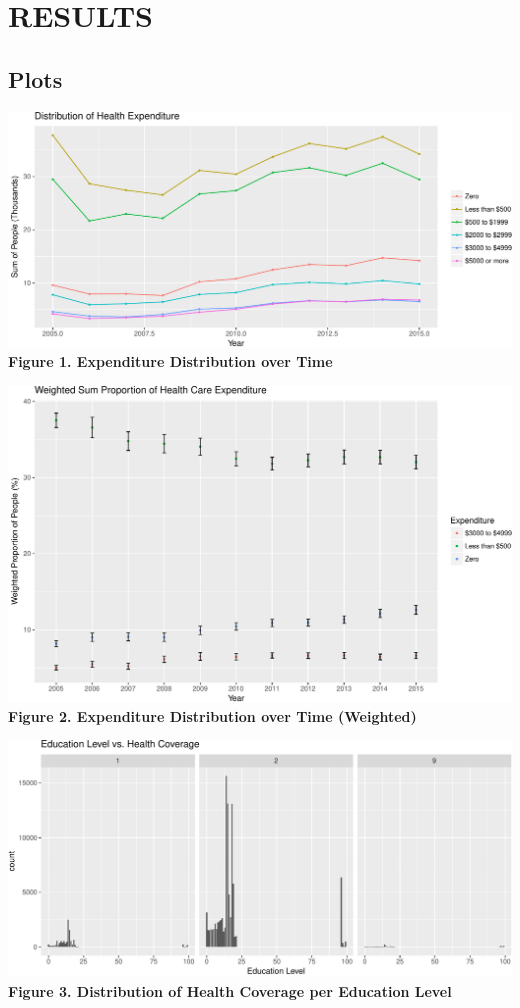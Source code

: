 \documentclass[10pt,]{article}
\makeatletter
\def\maxwidth{\ifdim\Gin@nat@width>\linewidth\linewidth
\else\Gin@nat@width\fi}
\let\Oldincludegraphics\includegraphics
\renewcommand{\includegraphics}[1]{\Oldincludegraphics[width=\maxwidth]{#1}}
\makeatother
\begin{document}
\section{RESULTS}\label{results}

\subsection{\texorpdfstring{\textbf{Plots}}{Plots}}\label{plots}

\includegraphics{paper_files/figure-latex/expenddistribution-1.pdf}
\textbf{Figure 1. Expenditure Distribution over Time}

\smallskip

\includegraphics{paper_files/figure-latex/weightedexpendproportion-1.pdf}
\textbf{Figure 2. Expenditure Distribution over Time (Weighted)}

\smallskip

\includegraphics{paper_files/figure-latex/healthcovereduattainment-1.pdf}
\textbf{Figure 3. Distribution of Health Coverage per Education Level}
\end{document}
